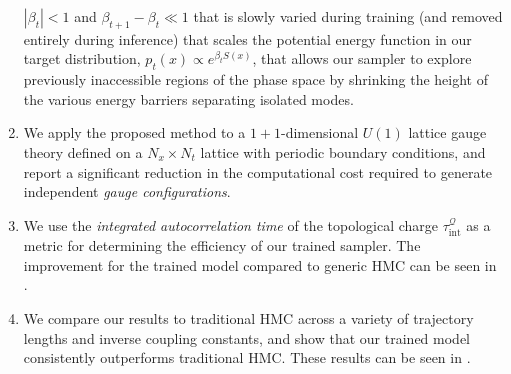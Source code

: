 \documentclass{article} %
\begin{document}
\begin{enumerate}
      \(|\beta_{t}|<1\) and \(\beta_{t+1} - \beta_{t} \ll 1\) that is slowly varied during training (and removed
      entirely during inference) that scales the potential energy function in our target distribution, \(p_{t}(x)\propto
      e^{\beta_{t}S(x)}\), that allows our sampler to explore previously inaccessible regions of the phase space by
      shrinking the height of the various energy barriers separating isolated modes.
   \item We apply the proposed method to a \(1+1\)-dimensional \(U(1)\) lattice gauge theory defined on a
      \(N_{x}\times N_{t}\) lattice with periodic boundary conditions, and report a significant reduction in the
      computational cost required to generate independent \emph{gauge configurations}.
   \item We use the \emph{integrated autocorrelation time} of the topological charge
      \(\tau_{\mathrm{int}}^{\mathcal{Q}}\) as a metric for determining the efficiency of our trained sampler.
      The improvement for the trained model compared to generic HMC can be seen in .
   \item We compare our results to traditional HMC across a variety of trajectory lengths and inverse coupling
      constants, and show that our trained model consistently outperforms traditional HMC.\@
      These results can be seen in .
\end{enumerate}
%
\end{document}
